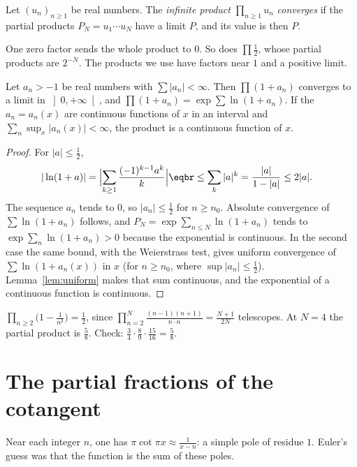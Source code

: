 \begin{definition}
Let $(u_n)_{n\ge1}$ be real numbers. The \emph{infinite product} $\prod_{n\ge1}u_n$ \emph{converges} if the partial products
$P_N=u_1\cdots u_N$ have a limit $P$, and its value is then $P$.
\end{definition}

One zero factor sends the whole product to $0$. So does $\prod\frac12$, whose partial products are $2^{-N}$. The products we use have factors near $1$ and a positive limit.

\begin{proposition}\label{prop:products}
Let $a_n>-1$ be real numbers with $\sum|a_n|<\infty$. Then $\prod(1+a_n)$ converges to a limit in $\left]0,+\infty\right[$, and
$\prod(1+a_n)=\exp\sum\ln(1+a_n)$. If the $a_n=a_n(x)$ are continuous functions of $x$ in an interval and
$\sum_n\sup_x|a_n(x)|<\infty$, the product is a continuous function of $x$.
\end{proposition}
\begin{proof}
For $|a|\le\frac12$,
\[
\begin{aligned}|\ln(1+a)|&=\Bigl|\sum_{k\ge1}\frac{(-1)^{k-1}a^k}k\Bigr|\eqbr\le\sum_k|a|^k=\frac{|a|}{1-|a|}\le2|a|.\end{aligned}
\]
The sequence $a_n$ tends to $0$, so $|a_n|\le\frac12$ for $n\ge n_0$. Absolute convergence of $\sum\ln(1+a_n)$ follows, and $P_N=\exp\sum_{n\le N}\ln(1+a_n)$ tends to
$\exp\sum_n\ln(1+a_n)>0$ because the exponential is continuous. In the second case the same bound, with the Weierstrass test, gives uniform convergence of
$\sum\ln(1+a_n(x))$ in $x$ (for $n\ge n_0$, where $\sup|a_n|\le\frac12$). Lemma~\ref{lem:uniform} makes that sum continuous, and the exponential of a continuous function is continuous.
\end{proof}

\begin{example}
$\prod_{n\ge2}\bigl(1-\frac1{n^2}\bigr)=\frac12$, since $\prod_{n=2}^N\frac{(n-1)(n+1)}{n\cdot n}=\frac{N+1}{2N}$ telescopes. At $N=4$ the partial product is $\frac58$. Check: $\frac34\cdot\frac89\cdot\frac{15}{16}=\frac58$.
\end{example}

\section{The partial fractions of the cotangent}

Near each integer $n$, one has $\pi\cot\pi x\approx\frac1{x-n}$: a simple pole of residue $1$. Euler's guess was that the function is the sum of these poles.

